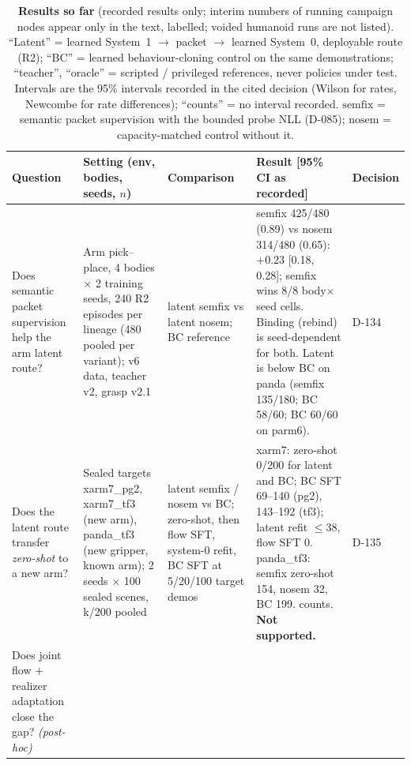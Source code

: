 \documentclass[10pt,twocolumn]{article}
\begin{document}
\begin{table}[t]\centering\footnotesize
\setlength{\tabcolsep}{3pt}\renewcommand{\arraystretch}{1.0}
\caption{\textbf{Results so far} (recorded results only; interim numbers of running campaign nodes appear only in the text, labelled; voided humanoid runs are not listed). ``Latent'' = learned System~1 $\to$ packet $\to$ learned System~0, deployable route (R2); ``BC'' = learned behaviour-cloning control on the same demonstrations; ``teacher'', ``oracle'' = scripted / privileged references, never policies under test. Intervals are the 95\% intervals recorded in the cited decision (Wilson for rates, Newcombe for rate differences); ``counts'' = no interval recorded. $\mathrm{semfix}$ = semantic packet supervision with the bounded probe NLL (D-085); $\mathrm{nosem}$ = capacity-matched control without it.}
\label{tab:results}
\begin{tabularx}{\textwidth}{@{}>{\raggedright\arraybackslash}p{2.75cm}>{\raggedright\arraybackslash}p{3.9cm}>{\raggedright\arraybackslash}p{3.0cm}>{\raggedright\arraybackslash}X>{\raggedright\arraybackslash}p{1.25cm}@{}}
\toprule
Question & Setting (env, bodies, seeds, $n$) & Comparison & Result [95\% CI as recorded] & Decision \\
\midrule
Does semantic packet supervision help the arm latent route? &
Arm pick--place, 4 bodies $\times$ 2 training seeds, 240 R2 episodes per lineage (480 pooled per variant); v6 data, teacher v2, grasp v2.1 &
latent semfix vs latent nosem; BC reference &
semfix 425/480 (0.89) vs nosem 314/480 (0.65): $+0.23$ [0.18, 0.28]; semfix wins 8/8 body$\times$seed cells. Binding (rebind) is seed-dependent for both. Latent is below BC on panda (semfix 135/180; BC 58/60; BC 60/60 on parm6). &
D-134 \\
\addlinespace
Does the latent route transfer \emph{zero-shot} to a new arm? &
Sealed targets xarm7\_pg2, xarm7\_tf3 (new arm), panda\_tf3 (new gripper, known arm); 2 seeds $\times$ 100 sealed scenes, k/200 pooled &
latent semfix / nosem vs BC; zero-shot, then flow SFT, system-0 refit, BC SFT at 5/20/100 target demos &
xarm7: zero-shot 0/200 for latent and BC; BC SFT 69--140 (pg2), 143--192 (tf3); latent refit $\le$38, flow SFT 0. panda\_tf3: semfix zero-shot 154, nosem 32, BC 199. counts. \textbf{Not supported.} &
D-135 \\
\addlinespace
Does joint flow + realizer adaptation close the gap? \emph{(post-hoc)} &

\end{tabularx}
\end{table}
\end{document}
